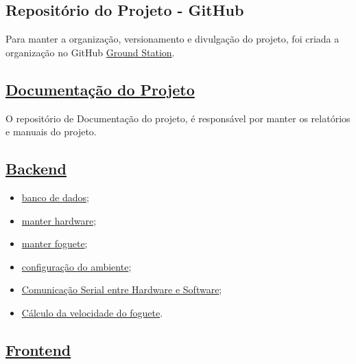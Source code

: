 \begin{apendicesenv}

\partapendices

\chapter{Repositório do Projeto - GitHub}
\label{repositorio}

Para manter a organização, versionamento e divulgação do projeto, foi criada a organização no GitHub \href{https://github.com/Ground-Station}{Ground Station}.

\section{\href{https://github.com/Ground-Station/Documentation}{Documentação do Projeto}}

O repositório de Documentação do projeto, é responsável por manter os relatórios e manuais do projeto. 
 
\section{\href{https://github.com/Ground-Station/backend}{Backend}}

\begin{itemize}
    \item \href{https://github.com/Ground-Station/backend/tree/main/src/datasources}{banco de dados};  
    \item \href{https://github.com/Ground-Station/backend/pull/2/files}{manter hardware}; 
    \item \href{https://github.com/Ground-Station/backend/pull/1/files}{manter foguete}; 
    \item \href{https://github.com/Ground-Station/backend/pull/3/files}{configuração do ambiente};
    \item \href{https://github.com/Ground-Station/backend/pull/5/files}{Comunicação Serial entre Hardware e Software};
    \item \href{https://github.com/Ground-Station/backend/pull/4/files}{Cálculo da velocidade do foguete}.
\end{itemize} 
\section{\href{https://github.com/Ground-Station/frontend}{Frontend}}


\end{apendicesenv}
